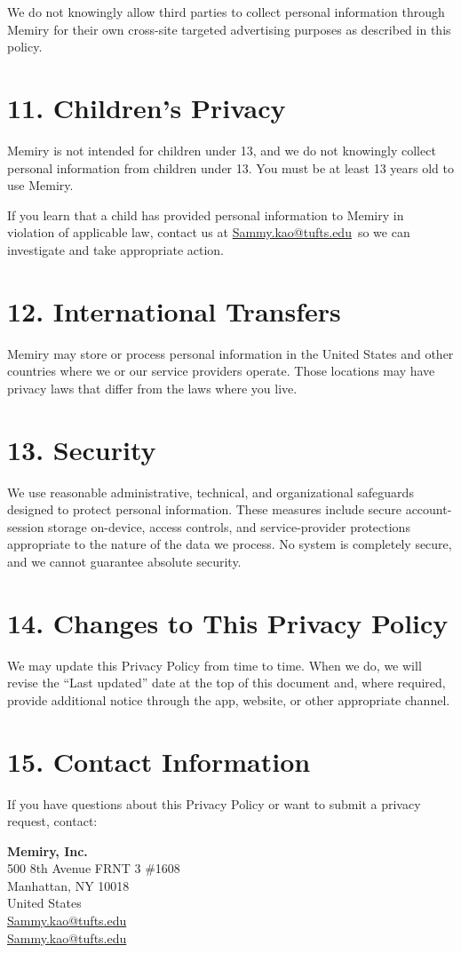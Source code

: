 \documentclass[11pt]{article}
\makeatletter
\newcommand{\CompanyName}{Memiry, Inc.}
\newcommand{\CompanyAddress}{500 8th Avenue FRNT 3 \#1608\\Manhattan, NY 10018\\United States}
\newcommand{\PrivacyEmail}{\href{mailto:Sammy.kao@tufts.edu}{Sammy.kao@tufts.edu}}
\newcommand{\SupportContact}{\href{mailto:Sammy.kao@tufts.edu}{Sammy.kao@tufts.edu}}
\newcommand{\MinimumAge}{You must be at least 13 years old to use Memiry.}
\makeatother
\begin{document}
We do not knowingly allow third parties to collect personal information through Memiry for their own cross-site targeted advertising purposes as described in this policy.

\section*{11. Children's Privacy}

Memiry is not intended for children under 13, and we do not knowingly collect personal information from children under 13. \MinimumAge

If you learn that a child has provided personal information to Memiry in violation of applicable law, contact us at \PrivacyEmail\ so we can investigate and take appropriate action.

\section*{12. International Transfers}

Memiry may store or process personal information in the United States and other countries where we or our service providers operate. Those locations may have privacy laws that differ from the laws where you live.

\section*{13. Security}

We use reasonable administrative, technical, and organizational safeguards designed to protect personal information. These measures include secure account-session storage on-device, access controls, and service-provider protections appropriate to the nature of the data we process. No system is completely secure, and we cannot guarantee absolute security.

\section*{14. Changes to This Privacy Policy}

We may update this Privacy Policy from time to time. When we do, we will revise the ``Last updated'' date at the top of this document and, where required, provide additional notice through the app, website, or other appropriate channel.

\section*{15. Contact Information}

If you have questions about this Privacy Policy or want to submit a privacy request, contact:

\textbf{\CompanyName}\\
\CompanyAddress\\
\PrivacyEmail\\
\SupportContact
\end{document}
